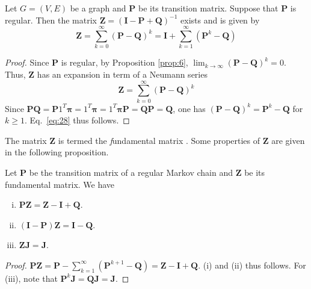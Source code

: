 \begin{proposition}
  \label{prop:7}
  Let $G = (V,E)$ be a graph and $\bm{P}$ be its transition
  matrix. Suppose that $\bm{P}$ is regular. Then the matrix $\bm{Z} =
  (\bm{I} - \bm{P} + \bm{Q})^{-1}$ exists and is given by
  \begin{equation}
    \label{eq:28}
    \bm{Z} = \sum_{k=0}^{\infty}(\bm{P} - \bm{Q})^{k} = \bm{I} +
    \sum_{k=1}^{\infty}(\bm{P}^{k} - \bm{Q})
  \end{equation}
  
\end{proposition}
\begin{proof}
  Since $\bm{P}$ is regular, by Proposition \ref{prop:6}, $\lim_{k
    \rightarrow \infty}(\bm{P} - \bm{Q})^{k} = 0$. Thus, $\bm{Z}$ has
  an expansion in term of a Neumann series
  \begin{equation}
    \label{eq:29}
    \bm{Z} = \sum_{k=0}^{\infty}(\bm{P} - \bm{Q})^{k}
  \end{equation}
  Since $\bm{P}\bm{Q} = \bm{P}1^{T}\bm{\pi} = 1^{T}\bm{\pi} = 
  1^{T}\bm{\pi}\bm{P} = \bm{Q}\bm{P} = \bm{Q}$,  
  one has $(\bm{P} - \bm{Q})^{k} = \bm{P}^{k} - \bm{Q}$ for $k \geq
  1$. Eq.~\eqref{eq:28} thus follows. 
\end{proof}
The matrix $\bm{Z}$ is termed the {\emph fundamental matrix}
\cite{kemeny83:_finit_markov_chain}. Some properties of
$\bm{Z}$ are given in the following proposition.
\begin{proposition}
  \label{prop:8}
  Let $\bm{P}$ be the transition matrix of a regular Markov chain and
  $\bm{Z}$ be its fundamental matrix. We have
  \begin{enumerate}[(i)]
  \item $\bm{P}\bm{Z} = \bm{Z} - \bm{I} + \bm{Q}$. 
  \item $(\bm{I} - \bm{P})\bm{Z} = \bm{I} - \bm{Q}$.
  \item $\bm{Z} \bm{J} = \bm{J}$. 
  \end{enumerate}
\end{proposition}
\begin{proof}
  $\bm{P}\bm{Z} = \bm{P} - \sum_{k=1}^{\infty}(\bm{P}^{k+1} - \bm{Q})
  = \bm{Z} - \bm{I} + \bm{Q}$. (i) and (ii) thus follows. For (iii),
  note that $\bm{P}^{k}\bm{J} = \bm{Q}\bm{J} = \bm{J}$. 
\end{proof}
